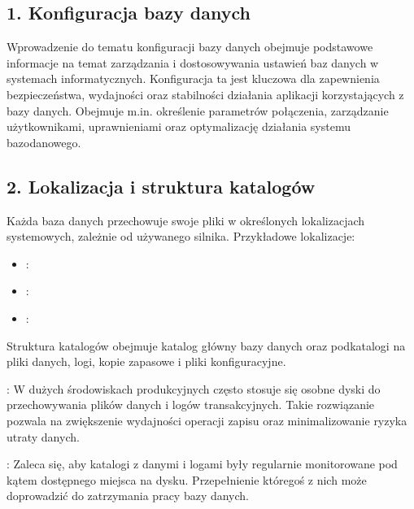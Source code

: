 \documentclass[letterpaper,10pt,polish]{sphinxmanual}
\begin{document}
\subsection{1. Konfiguracja bazy danych}
\label{\detokenize{rozdzial2/Konfiguracja_baz_danych/Konfiguracja_baz_danych:konfiguracja-bazy-danych}}
\sphinxAtStartPar
Wprowadzenie do tematu konfiguracji bazy danych obejmuje podstawowe informacje na temat zarządzania i dostosowywania ustawień baz danych w systemach informatycznych. Konfiguracja ta jest kluczowa dla zapewnienia bezpieczeństwa, wydajności oraz stabilności działania aplikacji korzystających z bazy danych. Obejmuje m.in. określenie parametrów połączenia, zarządzanie użytkownikami, uprawnieniami oraz optymalizację działania systemu bazodanowego.


\subsection{2. Lokalizacja i struktura katalogów}
\label{\detokenize{rozdzial2/Konfiguracja_baz_danych/Konfiguracja_baz_danych:lokalizacja-i-struktura-katalogow}}
\sphinxAtStartPar
Każda baza danych przechowuje swoje pliki w określonych lokalizacjach systemowych, zależnie od używanego silnika. Przykładowe lokalizacje:
\begin{itemize}
\item {} 
\sphinxAtStartPar
{}: 

\item {} 
\sphinxAtStartPar
{}: 

\item {} 
\sphinxAtStartPar
{}: 

\end{itemize}

\sphinxAtStartPar
Struktura katalogów obejmuje katalog główny bazy danych oraz podkatalogi na pliki danych, logi, kopie zapasowe i pliki konfiguracyjne.

\sphinxAtStartPar
{}: W dużych środowiskach produkcyjnych często stosuje się osobne dyski do przechowywania plików danych i logów transakcyjnych. Takie rozwiązanie pozwala na zwiększenie wydajności operacji zapisu oraz minimalizowanie ryzyka utraty danych.

\sphinxAtStartPar
{}: Zaleca się, aby katalogi z danymi i logami były regularnie monitorowane pod kątem dostępnego miejsca na dysku. Przepełnienie któregoś z nich może doprowadzić do zatrzymania pracy bazy danych.
\end{document}
